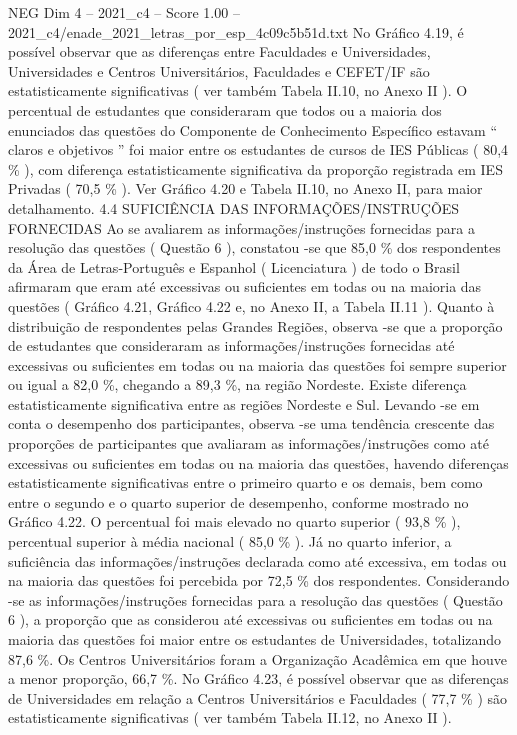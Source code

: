 \begin{textsample}{NEG Dim 4 – 2021\_c4 – Score 1.00 – 2021\_c4/enade\_2021\_letras\_por\_esp\_4c09c5b51d.txt}
No Gráfico 4.19, é possível observar que as diferenças entre Faculdades e Universidades, Universidades e Centros Universitários, Faculdades e CEFET/IF são estatisticamente significativas ( ver também Tabela II.10, no Anexo II ).
O percentual de estudantes que consideraram que todos ou a maioria dos enunciados das questões do Componente de Conhecimento Específico estavam “ claros e objetivos ” foi maior entre os estudantes de cursos de IES Públicas ( 80,4 \% ), com diferença estatisticamente significativa da proporção registrada em IES Privadas ( 70,5 \% ).
Ver Gráfico 4.20 e Tabela II.10, no Anexo II, para maior detalhamento. 4.4 SUFICIÊNCIA DAS INFORMAÇÕES/INSTRUÇÕES FORNECIDAS Ao se avaliarem as informações/instruções fornecidas para a resolução das questões ( Questão 6 ), constatou -se que 85,0 \% dos respondentes da Área de Letras-Português e Espanhol ( Licenciatura ) de todo o Brasil afirmaram que eram até excessivas ou suficientes em todas ou na maioria das questões ( Gráfico 4.21, Gráfico 4.22 e, no Anexo II, a Tabela II.11 ).
Quanto à distribuição de respondentes pelas Grandes Regiões, observa -se que a proporção de estudantes que consideraram as informações/instruções fornecidas até excessivas ou suficientes em todas ou na maioria das questões foi sempre superior ou igual a 82,0 \%, chegando a 89,3 \%, na região Nordeste.
Existe diferença estatisticamente significativa entre as regiões Nordeste e Sul.
Levando -se em conta o desempenho dos participantes, observa -se uma tendência crescente das proporções de participantes que avaliaram as informações/instruções como até excessivas ou suficientes em todas ou na maioria das questões, havendo diferenças estatisticamente significativas entre o primeiro quarto e os demais, bem como entre o segundo e o quarto superior de desempenho, conforme mostrado no Gráfico 4.22.
O percentual foi mais elevado no quarto superior ( 93,8 \% ), percentual superior à média nacional ( 85,0 \% ).
Já no quarto inferior, a suficiência das informações/instruções declarada como até excessiva, em todas ou na maioria das questões foi percebida por 72,5 \% dos respondentes.
Considerando -se as informações/instruções fornecidas para a resolução das questões ( Questão 6 ), a proporção que as considerou até excessivas ou suficientes em todas ou na maioria das questões foi maior entre os estudantes de Universidades, totalizando 87,6 \%.
Os Centros Universitários foram a Organização Acadêmica em que houve a menor proporção, 66,7 \%.
No Gráfico 4.23, é possível observar que as diferenças de Universidades em relação a Centros Universitários e Faculdades ( 77,7 \% ) são estatisticamente significativas ( ver também Tabela II.12, no Anexo II ).

\end{textsample}
